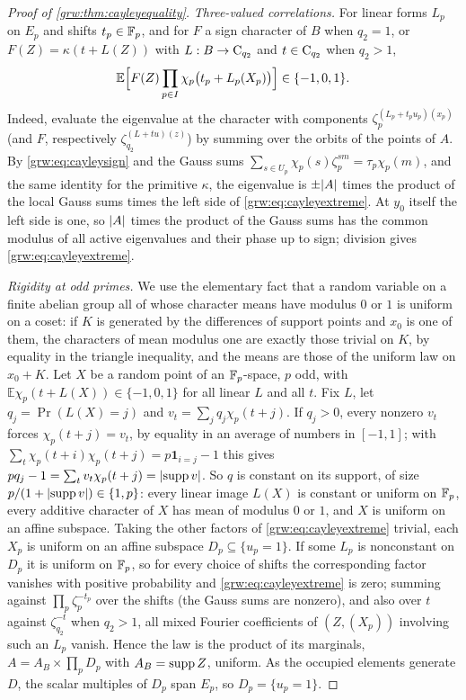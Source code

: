 \begin{proof}[Proof of \cref{grw:thm:cayleyequality}]
\emph{Three-valued correlations.} For linear forms $L_p$ on $E_p$ and
shifts $t_p\in\mathbb{F}_p$, and for $F$ a sign character of $B$ when $q_2=1$, or
$F(Z)=\kappa(t+L(Z))$ with $L:B\to\mathrm{C}_{q_2}$ and $t\in\mathrm{C}_{q_2}$
when $q_2>1$,
\begin{equation}\label{grw:eq:cayleyextreme}
 \mathbb E\Bigl[F(Z)\prod_{p\in I}\chi_p\bigl(t_p+L_p(X_p)\bigr)\Bigr]\in\{-1,0,1\}.
\end{equation}
Indeed, evaluate the eigenvalue at the character with components
$\zeta_p^{(L_p+t_pu_p)(x_p)}$ (and $F$, respectively
$\zeta_{q_2}^{(L+tu)(z)}$) by summing over the orbits of the points of
$A$. By \eqref{grw:eq:cayleysign} and the Gauss sums
$\sum_{s\in U_p}\chi_p(s)\zeta_p^{sm}=\tau_p\chi_p(m)$, and the same
identity for the primitive $\kappa$, the eigenvalue is $\pm\lvert A\rvert$ times
the product of the local Gauss sums times the left side of
\eqref{grw:eq:cayleyextreme}. At $y_0$ itself the left side is one, so
$\lvert A\rvert$ times the product of the Gauss sums has the common modulus of all
active eigenvalues and their phase up to sign; division gives
\eqref{grw:eq:cayleyextreme}.

\emph{Rigidity at odd primes.} We use the elementary fact that a random
variable on a finite abelian group all of whose character means have
modulus $0$ or $1$ is uniform on a coset: if $K$ is generated by the
differences of support points and $x_0$ is one of them, the characters of
mean modulus one are exactly those trivial on $K$, by equality in the
triangle inequality, and the means are those of the uniform law on
$x_0+K$. Let $X$ be a random point of an $\mathbb{F}_p$-space, $p$ odd, with
$\mathbb E\chi_p(t+L(X))\in\{-1,0,1\}$ for all linear $L$ and all $t$.
Fix $L$, let $q_j=\Pr(L(X)=j)$ and $v_t=\sum_jq_j\chi_p(t+j)$. If $q_j>0$,
every nonzero $v_t$ forces $\chi_p(t+j)=v_t$, by equality in an average
of numbers in $[-1,1]$; with
$\sum_t\chi_p(t+i)\chi_p(t+j)=p\mathbf 1_{i=j}-1$ this gives
$pq_j-1=\sum_tv_t\chi_p(t+j)=\lvert\operatorname{supp} v\rvert$. So $q$ is constant on its
support, of size $p/(1+\lvert\operatorname{supp} v\rvert)\in\{1,p\}$: every linear image
$L(X)$ is constant or uniform on $\mathbb{F}_p$, every additive character of $X$
has mean of modulus $0$ or $1$, and $X$ is uniform on an affine subspace. Taking the other factors of \eqref{grw:eq:cayleyextreme}
trivial, each $X_p$ is uniform on an affine subspace $D_p\subseteq\{u_p=1\}$.
If some $L_p$ is nonconstant on $D_p$ it is uniform on $\mathbb{F}_p$, so for every
choice of shifts the corresponding factor vanishes with positive
probability and \eqref{grw:eq:cayleyextreme} is zero; summing against
$\prod_p\zeta_p^{-t_p}$ over the shifts (the Gauss sums are nonzero), and
also over $t$ against $\zeta_{q_2}^{-t}$ when $q_2>1$, all mixed Fourier
coefficients of $(Z,(X_p))$ involving such an $L_p$ vanish. Hence the law
is the product of its marginals, $A=A_B\times\prod_pD_p$ with
$A_B=\operatorname{supp} Z$, uniform. As the occupied elements generate $D$, the scalar
multiples of $D_p$ span $E_p$, so $D_p=\{u_p=1\}$.


\end{proof}
